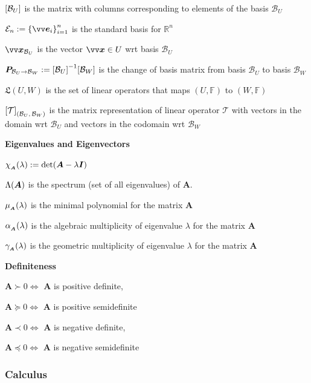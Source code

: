 \documentclass[11pt]{article}
\begin{document}
  \({\left[ \mathcal{B}_U \right]}\) is the matrix with columns corresponding to elements of the basis \(\mathcal{B}_U\)

  \(\mathcal{E}_n := \brc{\vect{e}_i}_{i = 1}^n\) is the standard basis for \(\mathbb{R}^n\)

  \(\vect{x}_{\mathcal{B}_U}\) is the vector \(\vect{x} \in U\) wrt basis \(\mathcal{B}_U\)

  \(\bm{P}_{\mathcal{B}_U \to \mathcal{B}_W} := {\left[ \mathcal{B}_U \right]}^{-1}{\left[ \mathcal{B}_W \right]}\) is the change of basis matrix
  from basis \(\mathcal{B}_U\) to basis \(\mathcal{B}_W\)

  \(\mathfrak{L}(U, W)\) is the set of linear operators that maps
  \((U, \mathbb{F})\) to \((W, \mathbb{F})\)

  \({\left[ \mathcal{T} \right]}_{(\mathcal{B}_U,\, \mathcal{B}_W)}\) is the matrix representation of linear operator \(\mathcal{T}\)
  with vectors in the domain wrt \(\mathcal{B}_U\) and vectors in the codomain
  wrt \(\mathcal{B}_W\)

  \vspace{12pt}

  \textbf{Eigenvalues and Eigenvectors}

  \(\chi_{_{\bm{A}}}(\lambda) := \mathrm{det}{\left( \bm{A} - \lambda\bm{I} \right)}\)

  \(\Lambda{\left( \bm{A} \right)}\) is the spectrum (set of all eigenvalues) of \(\bm{A}\).

  \(\mu_{_{\bm{A}}}(\lambda)\) is the minimal polynomial for the matrix \(\bm{A}\)

  \(\alpha_{_{\bm{A}}}(\lambda)\) is the algebraic multiplicity of eigenvalue \(\lambda\) for the matrix \(\bm{A}\)

  \(\gamma_{_{\bm{A}}}(\lambda)\) is the geometric multiplicity of eigenvalue \(\lambda\) for the matrix \(\bm{A}\)

  \vspace{12pt}

  \textbf{Definiteness}

  \(\bm{A} \succ 0 \iff \) \(\bm{A}\) is positive definite,

  \(\bm{A} \succeq 0 \iff\) \(\bm{A}\) is positive semidefinite

  \(\bm{A} \prec 0 \iff \) \(\bm{A}\) is negative definite,

  \(\bm{A} \preceq 0 \iff\) \(\bm{A}\) is negative semidefinite

  \pagebreak

  \subsubsection{Calculus}
\end{document}
